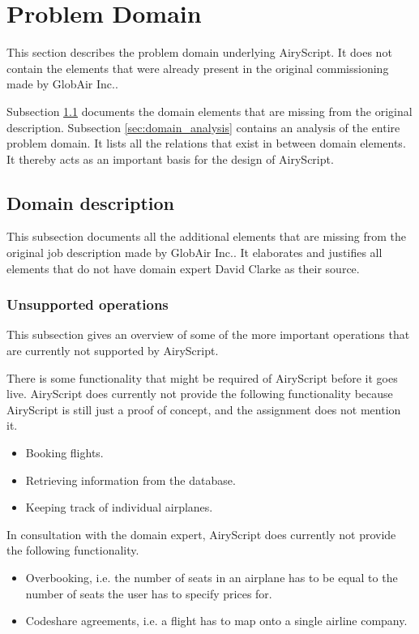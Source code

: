 \section{Problem Domain}
\label{sec:domain}

This section describes the problem domain underlying AiryScript. It does not
contain the elements that were already present in the original commissioning
made by GlobAir Inc..

Subsection \ref{sec:domain_description} documents the domain elements that are
missing from the original description.
%
Subsection \ref{sec:domain_analysis} contains an analysis of the entire problem
domain. It lists all the relations that exist in between domain elements.
It thereby acts as an important basis for the design of AiryScript.

\subsection{Domain description}
\label{sec:domain_description}
This subsection documents all the additional elements that are missing from the
original job description made by GlobAir Inc.. It elaborates and justifies all
elements that do not have domain expert David Clarke as their source.


\subsubsection{Unsupported operations}
This subsection gives an overview of some of the more important operations that
are currently not supported by AiryScript.

There is some functionality that might be required of AiryScript before it goes
live. AiryScript does currently not provide the following functionality because
AiryScript is still just a proof of concept, and the assignment does not mention
it.
\begin{itemize}
  \item Booking flights.
  \item Retrieving information from the database.
  \item Keeping track of individual airplanes.
\end{itemize}

In consultation with the domain expert, AiryScript does currently not provide
the following functionality.
\begin{itemize}
  \item Overbooking, i.e. the number of seats in an airplane has to be equal to
    the number of seats the user has to specify prices for.
  \item Codeshare agreements, i.e. a flight has to map onto a single airline
    company.
\end{itemize}

